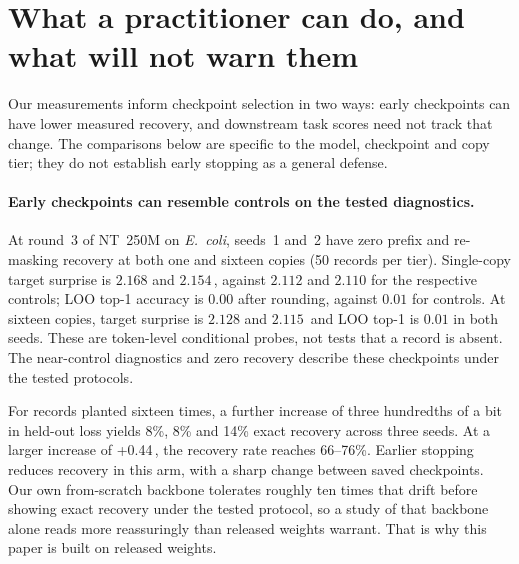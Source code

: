 \section{What a practitioner can do, and what will not warn them}
\label{sec:blind}

Our measurements inform checkpoint selection in two ways: early checkpoints can have
lower measured recovery, and downstream task scores need not track that change. The comparisons below
are specific to the model, checkpoint and copy tier; they do not establish early stopping as a general defense.

\paragraph{Early checkpoints can resemble controls on the tested diagnostics.}
At round~3 of NT~250M on \emph{E.~coli}, seeds~1 and~2 have zero prefix and re-masking
recovery at both one and sixteen copies (50 records per tier). Single-copy target surprise
is $2.168$ and $2.154$\,\bits{}, against $2.112$ and $2.110$ for the respective controls;
LOO top-1 accuracy is $0.00$ after rounding, against $0.01$ for controls. At sixteen copies,
target surprise is $2.128$ and $2.115$\,\bits{} and LOO top-1 is $0.01$ in both seeds.
These are token-level conditional probes, not tests that a record is absent. The near-control
diagnostics and zero recovery describe these checkpoints under the tested protocols.

For records planted sixteen times, a further increase of three hundredths of a bit
in held-out loss yields 8\%, 8\% and 14\% exact recovery across three seeds. At a larger increase of +0.44\,\bits, the recovery rate reaches 66--76\%. Earlier stopping reduces recovery in this arm, with a sharp change between saved checkpoints. Our own from-scratch backbone tolerates roughly ten times that drift before
showing exact recovery under the tested protocol, so a study of that backbone alone reads more reassuringly than
released weights warrant. That is why this paper is built on released weights.

